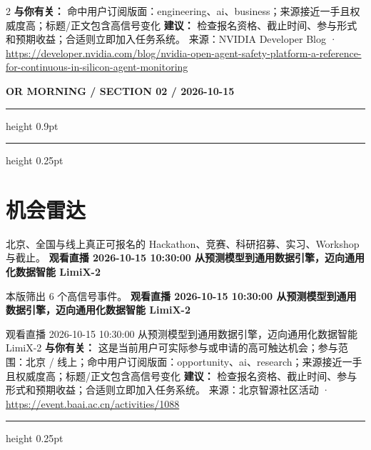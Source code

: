 \documentclass[10.5pt]{ctexart}
\begin{document}
\begin{multicols}{2}
\textbf{与你有关：} 命中用户订阅版面：engineering、ai、business；来源接近一手且权威度高；标题/正文包含高信号变化
\textbf{建议：} 检查报名资格、截止时间、参与形式和预期收益；合适则立即加入任务系统。
{\footnotesize\color{ormuted} 来源：NVIDIA Developer Blog · \url{https://developer.nvidia.com/blog/nvidia-open-agent-safety-platform-a-reference-for-continuous-in-silicon-agent-monitoring}}
\end{multicols}
\newpage
{\small\bfseries OR MORNING / SECTION 02 / 2026-10-15}
\vspace{2mm}
\hrule height 0.9pt
\vspace{1.5mm}
\hrule height 0.25pt
\vspace{4mm}
\section*{机会雷达}
{\color{ormuted} 北京、全国与线上真正可报名的 Hackathon、竞赛、科研招募、实习、Workshop 与截止。}
\vspace{2mm}
{\LARGE\bfseries 观看直播 2026-10-15 10:30:00 从预测模型到通用数据引擎，迈向通用化数据智能 LimiX-2}\par
\vspace{1mm}
{\color{ormuted} 本版筛出 6 个高信号事件。}
\vspace{3mm}
{\Large\bfseries 观看直播 2026-10-15 10:30:00 从预测模型到通用数据引擎，迈向通用化数据智能 LimiX-2}\par
观看直播 2026-10-15 10:30:00 从预测模型到通用数据引擎，迈向通用化数据智能 LimiX-2
\textbf{与你有关：} 这是当前用户可实际参与或申请的高可触达机会；参与范围：北京 / 线上；命中用户订阅版面：opportunity、ai、research；来源接近一手且权威度高；标题/正文包含高信号变化
\textbf{建议：} 检查报名资格、截止时间、参与形式和预期收益；合适则立即加入任务系统。
{\footnotesize\color{ormuted} 来源：北京智源社区活动 · \url{https://event.baai.ac.cn/activities/1088}}
\vspace{4mm}
\hrule height 0.25pt
\vspace{3mm}
\end{document}
